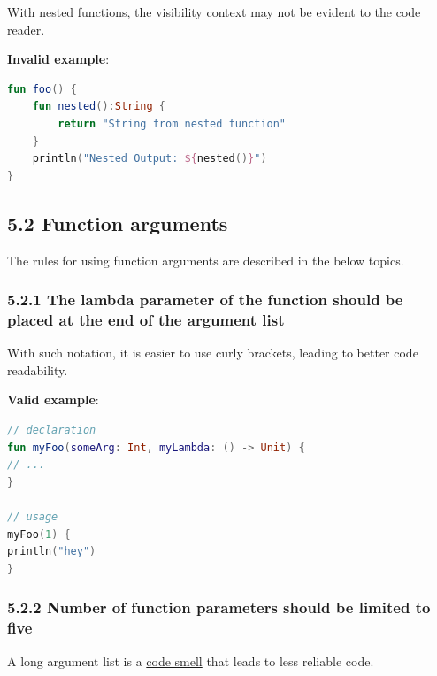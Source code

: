{{{{{{{{{{{{{{{{{{{{With nested functions, the visibility context may not be evident to the code reader.



\textbf{Invalid example}:

\begin{lstlisting}[language=Kotlin]
fun foo() { 
    fun nested():String { 
        return "String from nested function" 
    } 
    println("Nested Output: ${nested()}") 
} 
\end{lstlisting}


\subsection*{\textbf{5.2 Function arguments}}

\label{sec:5.2}

The rules for using function arguments are described in the below topics.

\subsubsection*{\textbf{5.2.1 The lambda parameter of the function should be placed at the end of the argument list}}
\leavevmode\newline

\label{sec:5.2.1}



With such notation, it is easier to use curly brackets, leading to better code readability.



\textbf{Valid example}:

\begin{lstlisting}[language=Kotlin]
// declaration
fun myFoo(someArg: Int, myLambda: () -> Unit) {
// ...
}

// usage
myFoo(1) { 
println("hey")
}
\end{lstlisting}


\subsubsection*{\textbf{5.2.2 Number of function parameters should be limited to five}}
\leavevmode\newline

\label{sec:5.2.2}



A long argument list is a \href{https://en.wikipedia.org/wiki/Code_smell}{code smell} that leads to less reliable code.

}}}}}}}}}}}}}}}}}}}}
